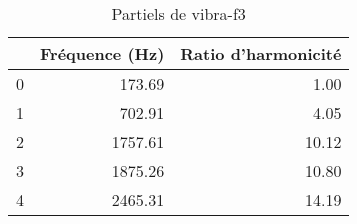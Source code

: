 \begin{table}
\centering
\caption{Partiels de vibra-f3}
\label{table:partiels-vibra-f3.wav}
\begin{tabular}{lrr}
\toprule
{} &  Fréquence (Hz) &  Ratio d'harmonicité \\
\midrule
0 &          173.69 &                 1.00 \\
1 &          702.91 &                 4.05 \\
2 &         1757.61 &                10.12 \\
3 &         1875.26 &                10.80 \\
4 &         2465.31 &                14.19 \\
\bottomrule
\end{tabular}
\end{table}
